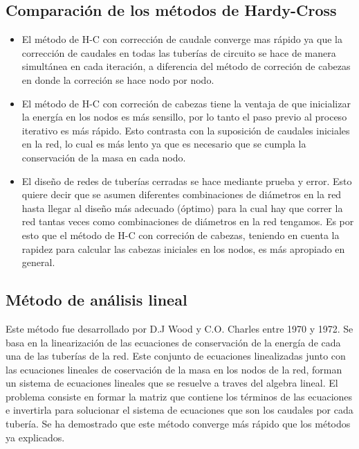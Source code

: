 \documentclass[11pt, oneside]{article}
\begin{document}
\subsection{Comparaci\'on de los m\'etodos de Hardy-Cross}
\begin{itemize}
\item El m\'etodo de H-C con correcci\'on de caudale converge mas r\'apido ya que la correcci\'on de caudales en todas las tuber\'ias de circuito se hace de manera simult\'anea en cada iteraci\'on, a diferencia del m\'etodo de correci\'on de cabezas en donde la correci\'on se hace nodo por nodo.
\item El m\'etodo de H-C con correci\'on de cabezas tiene la ventaja de que inicializar la energ\'ia en los nodos es m\'as sensillo, por lo tanto el paso previo al proceso iterativo es m\'as r\'apido. Esto contrasta con la suposici\'on de caudales iniciales en la red, lo cual es m\'as lento ya que es necesario que se cumpla la conservaci\'on de la masa en cada nodo. 
\item El dise\~no de redes de tuber\'ias cerradas se hace mediante prueba y error. Esto quiere decir que se asumen diferentes combinaciones de di\'ametros en la red hasta llegar al dise\~no m\'as adecuado (\'optimo) para la cual hay que correr la red tantas veces como combinaciones de di\'ametros en la red tengamos. Es por esto que el m\'etodo de H-C con correci\'on de cabezas, teniendo en cuenta la rapidez para calcular las cabezas iniciales en los nodos, es m\'as apropiado en general.  
\end{itemize}

\subsection{M\'etodo de an\'alisis lineal}
Este m\'etodo fue desarrollado por D.J Wood y C.O. Charles entre 1970 y 1972. Se basa en la linearizaci\'on de las ecuaciones de conservaci\'on de la energ\'ia de cada una de las tuber\'ias de la red. Este conjunto de ecuaciones linealizadas junto con las ecuaciones lineales de coservaci\'on de la masa en los nodos de la red, forman un sistema de ecuaciones lineales que se resuelve a traves del algebra lineal. El problema consiste en formar la matriz que contiene los t\'erminos de las ecuaciones e invertirla para solucionar el sistema de ecuaciones que son los caudales por cada tuber\'ia. Se ha demostrado  que este m\'etodo converge m\'as r\'apido que los m\'etodos ya explicados. 
\end{document}
